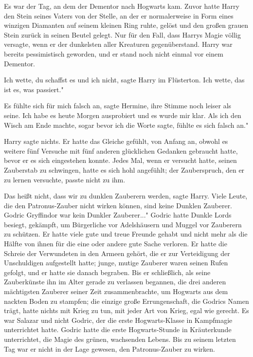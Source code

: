 Es war der Tag, an dem der Dementor nach Hogwarts kam. Zuvor hatte Harry den
Stein seines Vaters von der Stelle, an der er normalerweise in Form eines
winzigen Diamanten auf seinem kleinen Ring ruhte, gelöst und den großen grauen
Stein zurück in seinen Beutel gelegt. Nur für den Fall, dass Harrys Magie völlig
versagte, wenn er der dunkelsten aller Kreaturen gegenüberstand. Harry war
bereits pessimistisch geworden, und er stand noch nicht einmal vor einem
Dementor.

\glqq{}Ich wette, du schaffst es und ich nicht\grqq{}, sagte Harry im Flüsterton.
\glqq{}Ich wette, das ist es, was passiert."

\glqq{}Es fühlte sich für mich falsch an\grqq{}, sagte Hermine, ihre Stimme noch
leiser als seine. \glqq{}Ich habe es heute Morgen ausprobiert und es wurde mir
klar. Als ich den Wisch am Ende machte, sogar bevor ich die Worte sagte, fühlte
es sich falsch an."

Harry sagte nichts. Er hatte das Gleiche gefühlt, von Anfang an, obwohl es
weitere fünf Versuche mit fünf anderen glücklichen Gedanken gebraucht hatte,
bevor er es sich eingestehen konnte. Jedes Mal, wenn er versucht hatte, seinen
Zauberstab zu schwingen, hatte es sich hohl angefühlt; der Zauberspruch, den er
zu lernen versuchte, passte nicht zu ihm.

\glqq{}Das heißt nicht, dass wir zu dunklen Zauberern werden\grqq{}, sagte Harry.
\glqq{}Viele Leute, die den Patronus-Zauber nicht wirken können, sind keine
Dunklen Zauberer. Godric Gryffindor war kein Dunkler Zauberer..." Godric hatte
Dunkle Lords besiegt, gekämpft, um Bürgerliche vor Adelshäusern und Muggel vor
Zauberern zu schützen. Er hatte viele gute und treue Freunde gehabt und nicht
mehr als die Hälfte von ihnen für die eine oder andere gute Sache verloren. Er
hatte die Schreie der Verwundeten in den Armeen gehört, die er zur Verteidigung
der Unschuldigen aufgestellt hatte; junge, mutige Zauberer waren seinen Rufen
gefolgt, und er hatte sie danach begraben. Bis er schließlich, als seine
Zauberkünste ihn im Alter gerade zu verlassen begannen, die drei anderen
mächtigsten Zauberer seiner Zeit zusammenbrachte, um Hogwarts aus dem nackten
Boden zu stampfen; die einzige große Errungenschaft, die Godrics Namen trägt,
hatte nichts mit Krieg zu tun, mit jeder Art von Krieg, egal wie gerecht. Es war
Salazar und nicht Godric, der die erste Hogwarts-Klasse in Kampfmagie
unterrichtet hatte. Godric hatte die erste Hogwarts-Stunde in Kräuterkunde
unterrichtet, die Magie des grünen, wachsenden Lebens. Bis zu seinem letzten Tag
war er nicht in der Lage gewesen, den Patronus-Zauber zu wirken.

